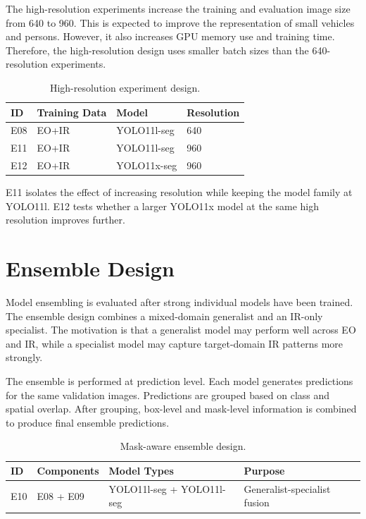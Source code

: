The high-resolution experiments increase the training and evaluation image size from 640 to 960. This is expected to improve the representation of small vehicles and persons. However, it also increases GPU memory use and training time. Therefore, the high-resolution design uses smaller batch sizes than the 640-resolution experiments.

\begin{table}[h]
\centering
\caption{High-resolution experiment design.}
\label{tab:high_resolution}
\begin{tabular}{llll}
\hline
\textbf{ID} & \textbf{Training Data} & \textbf{Model} & \textbf{Resolution} \\
\hline
E08 & EO+IR & YOLO11l-seg & 640 \\
E11 & EO+IR & YOLO11l-seg & 960 \\
E12 & EO+IR & YOLO11x-seg & 960 \\
\hline
\end{tabular}
\end{table}

E11 isolates the effect of increasing resolution while keeping the model family at YOLO11l. E12 tests whether a larger YOLO11x model at the same high resolution improves further.

\section{Ensemble Design}

Model ensembling is evaluated after strong individual models have been trained. The ensemble design combines a mixed-domain generalist and an IR-only specialist. The motivation is that a generalist model may perform well across EO and IR, while a specialist model may capture target-domain IR patterns more strongly.

The ensemble is performed at prediction level. Each model generates predictions for the same validation images. Predictions are grouped based on class and spatial overlap. After grouping, box-level and mask-level information is combined to produce final ensemble predictions.

\begin{table}[h]
\centering
\caption{Mask-aware ensemble design.}
\label{tab:ensemble_design}
\begin{tabular}{llll}
\hline
\textbf{ID} & \textbf{Components} & \textbf{Model Types} & \textbf{Purpose} \\
\hline
E10 & E08 + E09 & YOLO11l-seg + YOLO11l-seg & Generalist-specialist fusion \\
\hline
\end{tabular}
\end{table}

